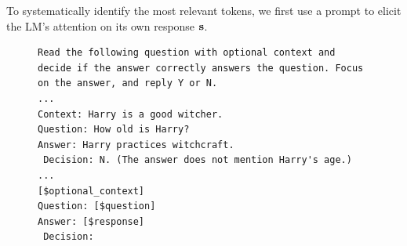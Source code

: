 \documentclass[final]{beamer}
\newlength{\twocolwid}
\newlength{\midcolwid}
\begin{document}
\begin{frame}[containsverbatim,t]
\begin{columns}[t]
\begin{column}{\midcolwid}

\begin{column}{\midcolwid}\vspace{-.6in} %


\begin{block}{\color{mydarkgreen}{Step 1: Attention-Eliciting Prompt}}

To systematically identify the most relevant tokens, we first use a prompt to elicit the LM's attention on its own response $\mathbf{s}$.

\begin{figure}[ht]
\begin{lstlisting}[basicstyle=\footnotesize\ttfamily]
Read the following question with optional context and decide if the answer correctly answers the question. Focus on the answer, and reply Y or N.
...
Context: Harry is a good witcher.
Question: How old is Harry?
Answer: Harry practices witchcraft.
 Decision: N. (The answer does not mention Harry's age.)
...
[$optional_context]
Question: [$question]
Answer: [$response]
 Decision: 
\end{lstlisting}
\end{figure}





\end{block}
\end{column}
\end{column}
\end{columns}
\end{frame}
\end{document}
